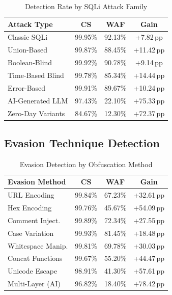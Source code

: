 \documentclass[10pt,twocolumn]{article}
\begin{document}
\begin{table}[H]
\centering
\caption{Detection Rate by SQLi Attack Family}
\label{tab:accuracy}
\small
\setlength{\tabcolsep}{4pt}
\begin{tabular}{@{}lccc@{}}
\toprule
\textbf{Attack Type} & \textbf{CS} & \textbf{WAF} & \textbf{Gain} \\
\midrule
Classic SQLi      & 99.95\% & 92.13\% & +7.82\,pp  \\
Union-Based       & 99.87\% & 88.45\% & +11.42\,pp \\
Boolean-Blind     & 99.92\% & 90.78\% & +9.14\,pp  \\
Time-Based Blind  & 99.78\% & 85.34\% & +14.44\,pp \\
Error-Based       & 99.91\% & 89.67\% & +10.24\,pp \\
AI-Generated LLM  & 97.43\% & 22.10\% & +75.33\,pp \\
Zero-Day Variants & 84.67\% & 12.30\% & +72.37\,pp \\
\bottomrule
\end{tabular}
\end{table}

\subsection{Evasion Technique Detection}

\begin{table}[H]
\centering
\caption{Evasion Detection by Obfuscation Method}
\label{tab:evasion}
\small
\setlength{\tabcolsep}{3pt}
\begin{tabular}{@{}p{2.2cm}ccc@{}}
\toprule
\textbf{Evasion Method} & \textbf{CS} & \textbf{WAF} & \textbf{Gain} \\
\midrule
URL Encoding      & 99.84\% & 67.23\% & +32.61\,pp \\
Hex Encoding      & 99.76\% & 45.67\% & +54.09\,pp \\
Comment Inject.   & 99.89\% & 72.34\% & +27.55\,pp \\
Case Variation    & 99.93\% & 81.45\% & +18.48\,pp \\
Whitespace Manip. & 99.81\% & 69.78\% & +30.03\,pp \\
Concat Functions  & 99.67\% & 55.20\% & +44.47\,pp \\
Unicode Escape    & 98.91\% & 41.30\% & +57.61\,pp \\
Multi-Layer (AI)  & 96.82\% & 18.40\% & +78.42\,pp \\
\bottomrule
\end{tabular}
\end{table}
\end{document}
